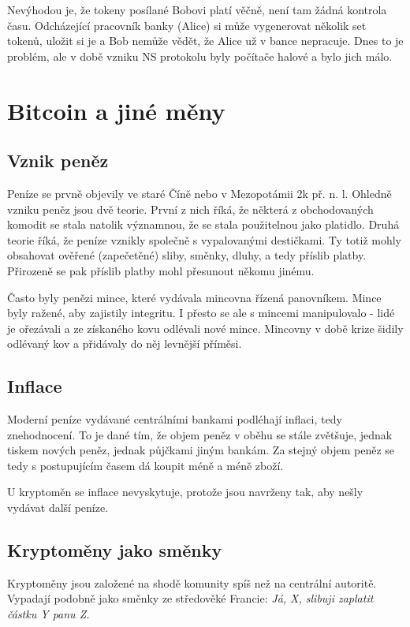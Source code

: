 Nevýhodou je, že tokeny posílané Bobovi platí věčně, není tam žádná kontrola času. Odcházející pracovník banky (Alice) si může vygenerovat několik set tokenů, uložit si je a Bob nemůže vědět, že Alice už v bance nepracuje. Dnes to je problém, ale v době vzniku NS protokolu byly počítače halové a bylo jich málo.





\section{Bitcoin a jiné měny}

\subsection{Vznik peněz}
Peníze se prvně objevily ve staré Číně nebo v Mezopotámii 2k př. n. l. Ohledně vzniku peněz jsou dvě teorie. První z nich říká, že některá z obchodovaných komodit se stala natolik významnou, že se stala použitelnou jako platidlo. Druhá teorie říká, že peníze vznikly společně s vypalovanými destičkami. Ty totiž mohly obsahovat ověřené (zapečetěné) sliby, směnky, dluhy, a tedy příslib platby. Přirozeně se pak příslib platby mohl přesunout někomu jinému.

Často byly penězi mince, které vydávala mincovna řízená panovníkem. Mince byly ražené, aby zajistily integritu. I přesto se ale s mincemi manipulovalo - lidé je ořezávali a ze získaného kovu odlévali nové mince. Mincovny v době krize šidily odlévaný kov a přidávaly do něj levnější příměsi.

\subsection{Inflace}
Moderní peníze vydávané centrálními bankami podléhají inflaci, tedy znehodnocení. To je dané tím, že objem peněz v oběhu se stále zvětšuje, jednak tiskem nových peněz, jednak půjčkami jiným bankám. Za stejný objem peněz se tedy s postupujícím časem dá koupit méně a méně zboží.

U kryptoměn se inflace nevyskytuje, protože jsou navrženy tak, aby nešly vydávat další peníze.

\subsection{Kryptoměny jako směnky}

Kryptoměny jsou založené na shodě komunity spíš než na centrální autoritě. Vypadají podobně jako směnky ze středověké Francie: \textit{Já, X, slibuji zaplatit částku Y panu Z.}

